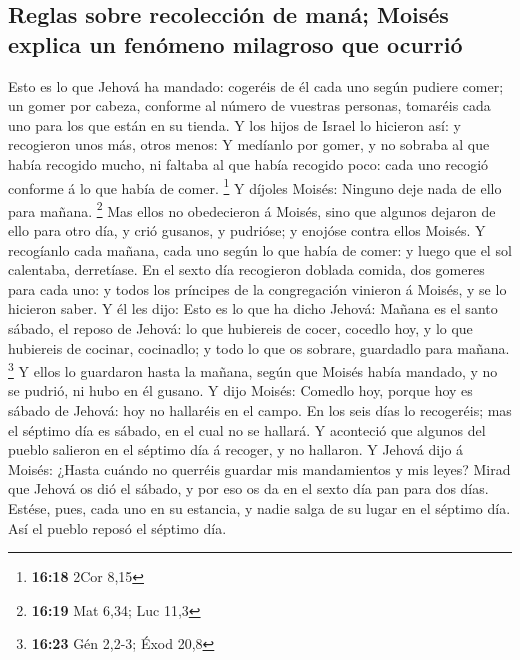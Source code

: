 \hypertarget{reglas-sobre-recolecciuxf3n-de-manuxe1-moisuxe9s-explica-un-fenuxf3meno-milagroso-que-ocurriuxf3}{%
\subsection{Reglas sobre recolección de maná; Moisés explica un fenómeno
milagroso que
ocurrió}\label{reglas-sobre-recolecciuxf3n-de-manuxe1-moisuxe9s-explica-un-fenuxf3meno-milagroso-que-ocurriuxf3}}

 Esto es lo que Jehová ha mandado: cogeréis de él cada uno
según pudiere comer; un gomer por cabeza, conforme al número de vuestras
personas, tomaréis cada uno para los que están en su tienda.
 Y los hijos de Israel lo hicieron así: y recogieron unos
más, otros menos:  Y medíanlo por gomer, y no sobraba al
que había recogido mucho, ni faltaba al que había recogido poco: cada
uno recogió conforme á lo que había de comer. \footnote{\textbf{16:18}
  2Cor 8,15}  Y díjoles Moisés: Ninguno deje nada de ello
para mañana. \footnote{\textbf{16:19} Mat 6,34; Luc 11,3} 
Mas ellos no obedecieron á Moisés, sino que algunos dejaron de ello para
otro día, y crió gusanos, y pudrióse; y enojóse contra ellos Moisés.
 Y recogíanlo cada mañana, cada uno según lo que había de
comer: y luego que el sol calentaba, derretíase.  En el
sexto día recogieron doblada comida, dos gomeres para cada uno: y todos
los príncipes de la congregación vinieron á Moisés, y se lo hicieron
saber.  Y él les dijo: Esto es lo que ha dicho Jehová:
Mañana es el santo sábado, el reposo de Jehová: lo que hubiereis de
cocer, cocedlo hoy, y lo que hubiereis de cocinar, cocinadlo; y todo lo
que os sobrare, guardadlo para mañana. \footnote{\textbf{16:23} Gén
  2,2-3; Éxod 20,8}  Y ellos lo guardaron hasta la mañana,
según que Moisés había mandado, y no se pudrió, ni hubo en él gusano.
 Y dijo Moisés: Comedlo hoy, porque hoy es sábado de
Jehová: hoy no hallaréis en el campo.  En los seis días lo
recogeréis; mas el séptimo día es sábado, en el cual no se hallará.
 Y aconteció que algunos del pueblo salieron en el séptimo
día á recoger, y no hallaron.  Y Jehová dijo á Moisés:
¿Hasta cuándo no querréis guardar mis mandamientos y mis leyes?
 Mirad que Jehová os dió el sábado, y por eso os da en el
sexto día pan para dos días. Estése, pues, cada uno en su estancia, y
nadie salga de su lugar en el séptimo día.  Así el pueblo
reposó el séptimo día.

